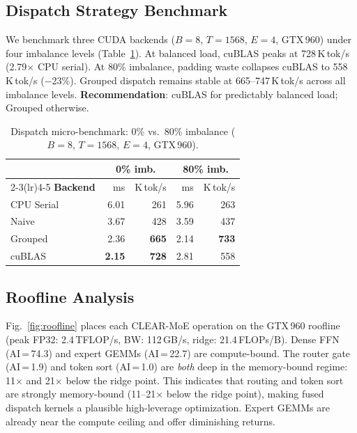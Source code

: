\documentclass[conference]{IEEEtran}
\begin{document}
\subsection{Dispatch Strategy Benchmark}

We benchmark three CUDA backends ($B{=}8$, $T{=}1568$, $E{=}4$, GTX\,960) under four imbalance levels (Table~\ref{tab:dispatch_main}). At balanced load, cuBLAS peaks at 728\,K\,tok/s (2.79$\times$ CPU serial). At 80\% imbalance, padding waste collapses cuBLAS to 558\,K\,tok/s ($-$23\%). Grouped dispatch remains stable at 665--747\,K\,tok/s across all imbalance levels. \textbf{Recommendation}: cuBLAS for predictably balanced load; Grouped otherwise.


\begin{table}[!t]
\caption{Dispatch micro-benchmark: 0\% vs.\ 80\% imbalance ($B{=}8$, $T{=}1568$, $E{=}4$, GTX\,960).}
\label{tab:dispatch_main}
\centering
\small
\setlength{\tabcolsep}{6pt}
\begin{tabular}{lrrrr}
\toprule
& \multicolumn{2}{c}{\textbf{0\% imb.}} & \multicolumn{2}{c}{\textbf{80\% imb.}} \\
\cmidrule(lr){2-3}\cmidrule(lr){4-5}
\textbf{Backend} & ms & K\,tok/s & ms & K\,tok/s \\
\midrule
CPU Serial & 6.01 & 261 & 5.96 & 263 \\
Naive      & 3.67 & 428 & 3.59 & 437 \\
Grouped    & 2.36 & \textbf{665} & 2.14 & \textbf{733} \\
cuBLAS     & \textbf{2.15} & \textbf{728} & 2.81 & 558 \\
\bottomrule
\end{tabular}
\end{table}

\subsection{Roofline Analysis}

Fig.~\ref{fig:roofline} places each CLEAR-MoE operation on the GTX\,960 roofline (peak FP32: 2.4\,TFLOP/s, BW: 112\,GB/s, ridge: 21.4\,FLOPs/B). Dense FFN (AI\,=\,74.3) and expert GEMMs (AI\,=\,22.7) are compute-bound. The router gate (AI\,=\,1.9) and token sort (AI\,=\,1.0) are \emph{both} deep in the memory-bound regime: 11$\times$ and 21$\times$ below the ridge point. This indicates that routing and token sort are strongly memory-bound (11--21$\times$ below the ridge point), making fused dispatch kernels a plausible high-leverage optimization. Expert GEMMs are already near the compute ceiling and offer diminishing returns.
\end{document}
